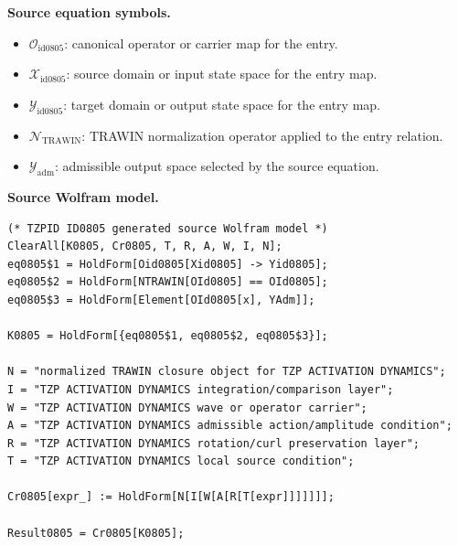 \begin{minipage}[t]{0.49\linewidth}
\begingroup
\small
\raggedright
\textbf{Source equation symbols.}\par
\begin{itemize}[leftmargin=1.35em,itemsep=1pt,topsep=1pt,parsep=0pt]
    \item $\mathcal{O}_{\mathrm{id0805}}$: canonical operator or carrier map for the entry.
    \item $\mathcal{X}_{\mathrm{id0805}}$: source domain or input state space for the entry map.
    \item $\mathcal{Y}_{\mathrm{id0805}}$: target domain or output state space for the entry map.
    \item $\mathcal{N}_{\mathrm{TRAWIN}}$: TRAWIN normalization operator applied to the entry relation.
    \item $\mathcal{Y}_{\mathrm{adm}}$: admissible output space selected by the source equation.
\end{itemize}
\endgroup
\end{minipage}\hfill
\begin{minipage}[t]{0.47\linewidth}
\begingroup
\scriptsize
\raggedright
\textbf{Source Wolfram model.}\par
\begin{Verbatim}[fontsize=\tiny,breaklines=true,breakanywhere=true]
(* TZPID ID0805 generated source Wolfram model *)
ClearAll[K0805, Cr0805, T, R, A, W, I, N];
eq0805$1 = HoldForm[Oid0805[Xid0805] -> Yid0805];
eq0805$2 = HoldForm[NTRAWIN[OId0805] == OId0805];
eq0805$3 = HoldForm[Element[OId0805[x], YAdm]];

K0805 = HoldForm[{eq0805$1, eq0805$2, eq0805$3}];

N = "normalized TRAWIN closure object for TZP ACTIVATION DYNAMICS";
I = "TZP ACTIVATION DYNAMICS integration/comparison layer";
W = "TZP ACTIVATION DYNAMICS wave or operator carrier";
A = "TZP ACTIVATION DYNAMICS admissible action/amplitude condition";
R = "TZP ACTIVATION DYNAMICS rotation/curl preservation layer";
T = "TZP ACTIVATION DYNAMICS local source condition";

Cr0805[expr_] := HoldForm[N[I[W[A[R[T[expr]]]]]]];

Result0805 = Cr0805[K0805];
\end{Verbatim}
\endgroup
\end{minipage}

